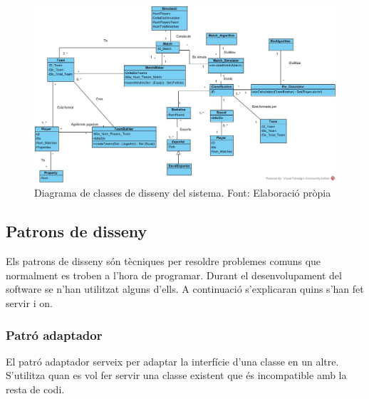 \documentclass[a4paper]{article}
\begin{document}
\begin{landscape}

\newpage
\thispagestyle{lndscape}
    \begin{center}
        \begin{figure}[h!]
            \includegraphics[width=1.5 \textwidth]{images/DessignClasses2.jpg}%
            \caption[Diagrama de classes de disseny del sistema]{Diagrama de classes de disseny del sistema. Font: Elaboració pròpia}
            \label{fig:DessignDiagram}
        \end{figure}
    \end{center}
\end{landscape}

\subsection{Patrons de disseny}

Els patrons de disseny són tècniques per resoldre problemes comuns que normalment es troben a l'hora de programar. Durant el desenvolupament del software se n'han utilitzat alguns d'ells. A continuació s'explicaran quins s'han fet servir i on.

\subsubsection*{Patró adaptador}
El patró adaptador serveix per adaptar la interfície d'una classe en un altre. S'utilitza quan es vol fer servir una classe existent que és incompatible amb la resta de codi.
\end{document}
